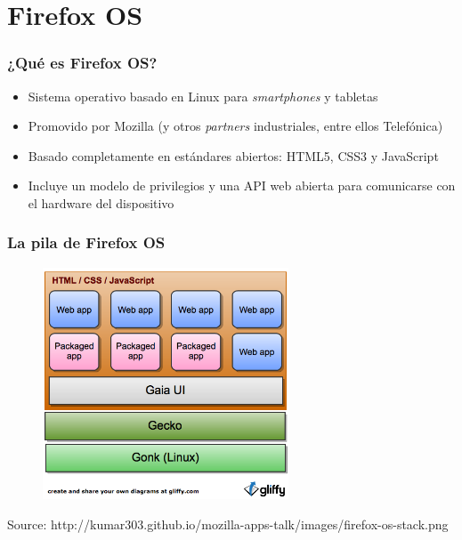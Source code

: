 
\section{Firefox OS}


\begin{frame}
\frametitle{¿Qué es Firefox OS?}

\begin{itemize}
  \item Sistema operativo basado en Linux para \emph{smartphones} y tabletas
  \item Promovido por Mozilla (y otros \emph{partners} industriales, entre ellos Telefónica)
  \item Basado completamente en estándares abiertos: HTML5, CSS3 y JavaScript
  \item Incluye un modelo de privilegios y una API web abierta para comunicarse con el hardware del dispositivo
\end{itemize}

\end{frame}



\begin{frame}
\frametitle{La pila de Firefox OS}

\begin{center}
\begin{figure}[p]
\includegraphics[width=0.65\textwidth]{figs/firefox-os-stack.png}
\end{figure}
\end{center}

\begin{flushright}
{\tiny
Source: http://kumar303.github.io/mozilla-apps-talk/images/firefox-os-stack.png
}
\end{flushright}

\end{frame}




